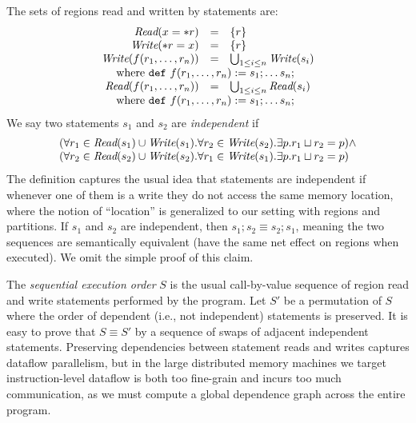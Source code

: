 The sets of regions read and written by statements are:
{\small
\[
\begin{array}{rcl}
\rread{x = \deref r} & = & \{ r \} \\
\rwrite{\deref r = x} & = & \{ r \} \\
\rwrite{f(r_1,\ldots,r_n)} & = & \bigcup_{1 \leq i \leq n}{\rwrite{s_i}} \\
\multicolumn{3}{l}{\ \ \ \ \mbox{where\ {\tt def}}\ f(r_1,\ldots,r_n): =   s_1; \ldots s_n;} \\
\rread{f(r_1,\ldots,r_n)} & = & \bigcup_{1 \leq i \leq n}{\rread{s_i}} \\
\multicolumn{3}{l}{\ \ \ \ \mbox{where\ {\tt def}}\ f(r_1,\ldots,r_n): =   s_1; \ldots s_n;} \\
\end{array}
\]
}
We say two statements $s_1$ and $s_2$ are {\em independent} if
\[
\begin{array}{l}
   (\forall r_1 \in \mbox{\em Read}(s_1) \cup \mbox{\em Write}(s_1).\forall r_2 \in \mbox{\em Write}(s_2). \exists p. r_1 \sqcup r_2 = p) \wedge \\
   (\forall r_2 \in \mbox{\em Read}(s_2) \cup \mbox{\em Write}(s_2).\forall r_1 \in \mbox{\em Write}(s_1). \exists p. r_1 \sqcup r_2 = p)
\end{array}
\]
The definition captures the usual idea that statements are independent if whenever one of them is a write they do not access the same memory location, where the notion of ``location'' is generalized to our setting with regions and partitions.  
If $s_1$ and $s_2$ are independent, then $s_1; s_2 \equiv s_2; s_1$, meaning the two sequences are semantically
equivalent (have the same net effect on regions when executed).  We omit the simple proof of this claim.


The {\em sequential execution order} $S$ is the usual call-by-value
sequence of region read and write statements performed by the program.  Let
$S'$ be a permutation of $S$ where the order of dependent (i.e., not
independent) statements is preserved.  It is easy to prove that
$S \equiv S'$ by a sequence of swaps of adjacent independent
statements.  
Preserving dependencies between statement reads and writes captures
dataflow parallelism, but in the large
distributed memory machines we target instruction-level dataflow
is both too fine-grain and incurs too much communication,
as we must compute a global dependence graph across the entire
program.  

